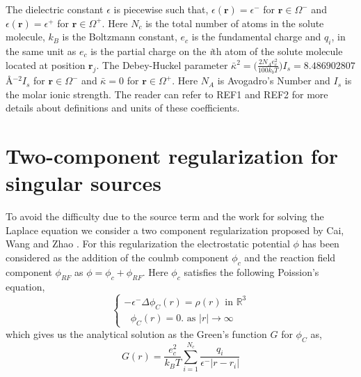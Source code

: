 The dielectric constant $\epsilon$ is piecewise such that, $\epsilon(\textbf{r})=\epsilon^-$ for $\textbf{r} \in \Omega^-$ and $\epsilon(\textbf{r})=\epsilon^+$ for $\textbf{r} \in \Omega^+$. Here $N_c$ is the total number of atoms in the solute molecule, $k_B$ is the Boltzmann constant, $e_c$ is the fundamental charge and $q_i$, in the same unit as $e_c$ is the partial charge on the \textit{i}th atom of the solute molecule located at position $\textbf{r}_j$. The Debey-Huckel parameter $\bar\kappa^2 =\Big(\frac{2N_A e_c^2}{100 k_b T}\Big)I_s =  8.486902807$\AA$^{-2} I_s$ \cite{Holst:1993} for $\textbf{r} \in \Omega^-$ and $\bar\kappa=0$ for $\textbf{r} \in \Omega^+$. Here $N_A$ is Avogadro’s Number and $I_s$ is the molar ionic strength. The reader can refer to REF1 and REF2 for more details about definitions and units of these coefficients. 
\section{Two-component regularization for singular sources}
\label{2_comp_reg}
To avoid the difficulty due to the source term and the work for solving the Laplace equation we consider a two component regularization proposed by Cai, Wang and Zhao \cite{Cai2009}. For this regularization the electrostatic potential $\phi$ has been considered as the addition of the coulmb component $\phi_c$ and the reaction field component $\phi_{RF}$ as $\phi= \phi_c +\phi_{RF}$. Here $\phi_c$ satisfies the following Poission's equation, 
\begin{equation}
	\begin{cases}
		-\epsilon^- \Delta\phi_C(r) = \rho(r) \text{   in   }\mathbb{R}^3 \label{rho_eq} \\
		\text{      }\phi_C(r)= 0. \text{   as  } |r| \rightarrow \infty
	\end{cases}
\end{equation}
which gives us the analytical solution as the Green's function $G$ for $\phi_C$ as,
\begin{equation}
	G(r) = \frac{e_c^2}{k_B T } \sum_{i=1}^{N_c} \frac{q_i }{\epsilon^{-}|r-r_i|} \label{Green} %
\end{equation}
	
